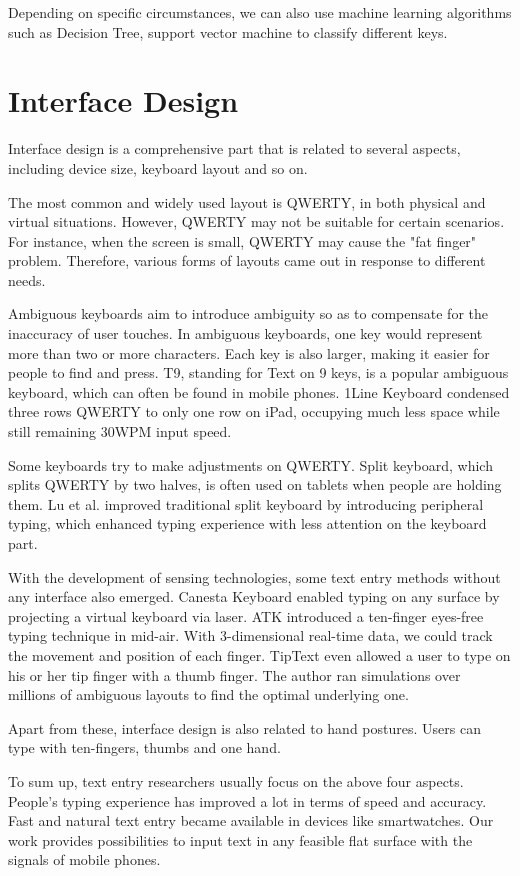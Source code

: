 \begin{survey}
Depending on specific circumstances, we can also use machine learning algorithms such as Decision Tree, support vector machine to classify different keys.

\section{Interface Design}
Interface design is a comprehensive part that is related to several aspects, including device size, keyboard layout and so on. 

The most common and widely used layout is QWERTY, in both physical and virtual situations. However, QWERTY may not be suitable for certain scenarios. For instance, when the screen is small, QWERTY may cause the "fat finger" problem. Therefore, various forms of layouts came out in response to different needs.

Ambiguous keyboards aim to introduce ambiguity so as to compensate for the inaccuracy of user touches. In ambiguous keyboards, one key would represent more than two or more characters. Each key is also larger, making it easier for people to find and press. T9, standing for Text on 9 keys, is a popular ambiguous keyboard, which can often be found in mobile phones. 1Line Keyboard\cite{li20111line} condensed three rows QWERTY to only one row on iPad, occupying much less space while still remaining 30WPM input speed.

Some keyboards try to make adjustments on QWERTY. Split keyboard, which splits QWERTY by two halves, is often used on tablets when people are holding them. Lu et al. \cite{lu2019typing} improved traditional split keyboard by introducing peripheral typing, which enhanced typing experience with less attention on the keyboard part.

With the development of sensing technologies, some text entry methods without any interface also emerged. Canesta Keyboard \cite{roeber2003typing} enabled typing on any surface by projecting a virtual keyboard via laser. ATK \cite{yi2015atk} introduced a ten-finger eyes-free typing technique in mid-air. With 3-dimensional real-time data, we could track the movement and position of each finger. TipText \cite{xu2019tiptext} even allowed a user to type on his or her tip finger with a thumb finger. The author ran simulations over millions of ambiguous layouts to find the optimal underlying one.

Apart from these, interface design is also related to hand postures. Users can type with ten-fingers, thumbs and one hand.

To sum up, text entry researchers usually focus on the above four aspects. People's typing experience has improved a lot in terms of speed and accuracy. Fast and natural text entry became available in devices like smartwatches. Our work provides possibilities to input text in any feasible flat surface with the signals of mobile phones.




\end{survey}

